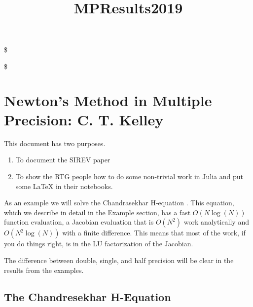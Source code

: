 \documentclass[11pt]{article}
\title{MPResults2019}
\begin{document}
    
    
    \maketitle
    
    

    
    \$

\newcommand{\calf}{{\cal F}}
\newcommand{\dnu}{d \nu}
\newcommand{\mf}{{\bf F}}
\newcommand{\vu}{{\bf u}}
\newcommand{\ve}{{\bf e}}
\newcommand{\ml}{{\bf L}}
\newcommand{\mg}{{\bf G}}
\newcommand{\mi}{{\bf I}}
\newcommand{\diag}{\mbox{diag}}
\newcommand{\begeq}{{\begin{equation}}}
\newcommand{\endeq}{{\end{equation}}}

\$

\hypertarget{newtons-method-in-multiple-precision-c.-t.-kelley}{%
\section{Newton's Method in Multiple Precision: C. T.
Kelley}\label{newtons-method-in-multiple-precision-c.-t.-kelley}}

This document has two purposes.

\begin{enumerate}
\def\labelenumi{\arabic{enumi}.}
\item
  To document the SIREV paper \cite{ctk:sirev19}
\item
  To show the RTG people how to do some non-trivial work in Julia and
  put some LaTeX in their notebooks.
\end{enumerate}

As an example we will solve the Chandrasekhar H-equation \cite{chand}.
This equation, which we describe in detail in the Example section, has a
fast \(O(N \log(N))\) function evaluation, a Jacobian evaluation that is
\(O(N^2)\) work analytically and \(O(N^2 \log(N))\) with a finite
difference. This means that most of the work, if you do things right, is
in the LU factorization of the Jacobian.

The difference between double, single, and half precision will be clear
in the results from the examples.

    \hypertarget{the-chandresekhar-h-equation}{%
\subsection{The Chandresekhar
H-Equation}\label{the-chandresekhar-h-equation}}
\end{document}
